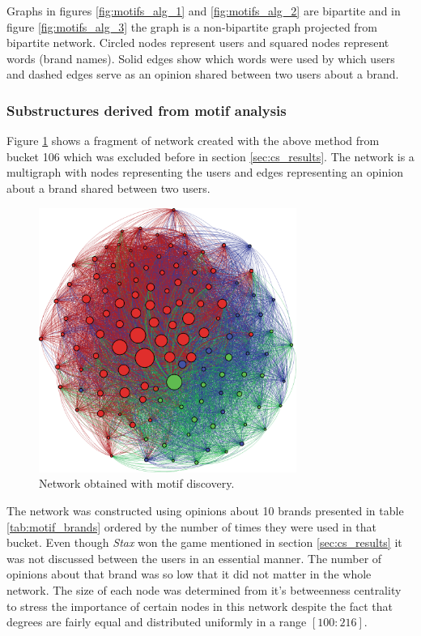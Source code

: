       Graphs in figures \ref{fig:motifs_alg_1} and \ref{fig:motifs_alg_2} are bipartite and in figure \ref{fig:motifs_alg_3} the graph is a non-bipartite graph projected from bipartite network. Circled nodes represent users and squared nodes represent words (brand names). Solid edges show which words were used by which users and dashed edges serve as an opinion shared between two users about a brand.
      
    \subsubsection{Substructures derived from motif analysis}
      
      Figure \ref{fig:motif_network} shows a fragment of network created with the above method from bucket 106 which was excluded before in section \ref{sec:cs_results}. The network is a multigraph with nodes representing the users and edges representing an opinion about a brand shared between two users.
      \begin{figure}[b!]
        \centering
        \includegraphics[width=0.75\textwidth]{chapters/03_implementation/motif_network}
        \caption{Network obtained with motif discovery.}
        \label{fig:motif_network}
      \end{figure}
      
      The network was constructed using opinions about 10 brands presented in table \ref{tab:motif_brands} ordered by the number of times they were used in that bucket. Even though \emph{Stax} won the game mentioned in section \ref{sec:cs_results} it was not discussed between the users in an essential manner. The number of opinions about that brand was so low that it did not matter in the whole network. The size of each node was determined from it's betweenness centrality to stress the importance of certain nodes in this network despite the fact that degrees are fairly equal and distributed uniformly in a range $[100:216]$.
      
